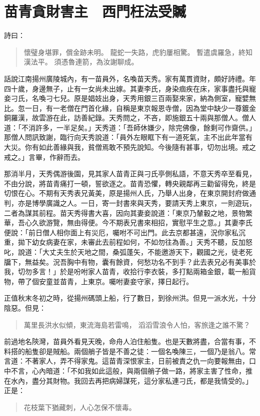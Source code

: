 
\chapter{苗青貪財害主　西門枉法受贓}

詩曰：
\begin{quote}
懷璧身堪罪，償金跡未明。
龍蛇一失路，虎豹屢相驚。
暫遣虞羅急，終知漢法平。
須憑魯連箭，為汝謝聊成。
\end{quote}

話說江南揚州廣陵城內，有一苗員外，名喚苗天秀。家有萬貫資財，頗好詩禮。年四十歲，身邊無子，止有一女尚未出嫁。其妻李氏，身染痼疾在床，家事盡托與寵妾刁氏，名喚刁七兒。原是娼妓出身，天秀用銀三百兩娶來家，納為側室，寵嬖無比。忽一日，有一老僧在門首化緣，自稱是東京報恩寺僧，因為堂中缺少一尊鍍金銅羅漢，故雲游在此，訪善紀錄。天秀問之，不吝，即施銀五十兩與那僧人。僧人道：「不消許多，一半足矣。」天秀道：「吾師休嫌少，除完佛像，餘剩可作齋供。」那僧人問訊致謝，臨行向天秀說道：「員外左眼眶下有一道死氣，主不出此年當有大災。你有如此善緣與我，貧僧焉敢不預先說知。今後隨有甚事，切勿出境。戒之戒之。」言畢，作辭而去。

那消半月，天秀偶游後園，見其家人苗青正與刁氏亭側私語，不意天秀卒至看見，不由分說，將苗青痛打一頓，誓欲逐之。苗青恐懼，轉央親鄰再三勸留得免，終是切恨在心。不期有天秀表兄黃美，原是揚州人氏，乃舉人出身，在東京開封府做通判，亦是博學廣識之人。一日，寄一封書來與天秀，要請天秀上東京，一則遊玩，二者為謀其前程。苗天秀得書大喜，因向其妻妾說道：「東京乃輦轂之地，景物繁華，吾心久欲游覽，無由得便。今不期表兄書來相招，實慰平生之意。」其妻李氏便說：「前日僧人相你面上有災厄，囑咐不可出門。此去京都甚遠，況你家私沉重，拋下幼女病妻在家，未審此去前程如何，不如勿往為善。」天秀不聽，反加怒叱，說道：「大丈夫生於天地之間，桑弧蓬矢，不能邀游天下，觀國之光，徒老死牖下，無益矣。況吾胸中有物，囊有餘資，何愁功名不到手？此去表兄必有美事於我，切勿多言！」於是吩咐家人苗青，收拾行李衣裝，多打點兩箱金銀，載一船貨物，帶了個安童並苗青，上東京。囑咐妻妾守家，擇日起行。

正值秋末冬初之時，從揚州碼頭上船，行了數日，到徐州洪。但見一派水光，十分陰惡。但見：
\begin{quote}
萬里長洪水似傾，東流海島若雷鳴，
滔滔雪浪令人怕，客旅逢之誰不驚？
\end{quote}

前過地名陝灣，苗員外看見天晚，命舟人泊住船隻。也是天數將盡，合當有事，不料搭的船隻卻是賊船。兩個艄子皆是不善之徒：一個名喚陳三，一個乃是翁八。常言道：不著家人，弄不得家鬼。這苗青深恨家主，日前被責之仇一向要報無由，口中不言，心內暗道：「不如我如此這般，與兩個艄子做一路，將家主害了性命，推在水內，盡分其財物。我回去再把病婦謀死，這分家私連刁氏，都是我情受的。」正是：
\begin{quote}
花枝葉下猶藏刺，人心怎保不懷毒。
\end{quote}

